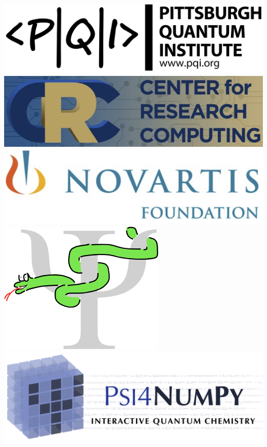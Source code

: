 \documentclass[%
    xcolor=usenames,dvipsnames,svgnames%
]{beamer}
\begin{document}
\begin{frame}
\begin{columns}
\begin{minipage}{1.0\linewidth}
      \includegraphics[width=0.90\linewidth,keepaspectratio]{./figures/PQI-Letter-Logo-black.png}
      \includegraphics[width=0.85\linewidth,keepaspectratio]{./figures/logo_crc.jpg}
      \includegraphics[width=0.95\linewidth,keepaspectratio]{./figures/logo_novartis.png}
      \includegraphics[scale=0.15]{./figures/logo_cclib.png}
      \includegraphics[width=1.00\linewidth,keepaspectratio]{./figures/psi4numpybanner_eqn.png}

\end{minipage}
\end{columns}
\end{frame}
\end{document}
